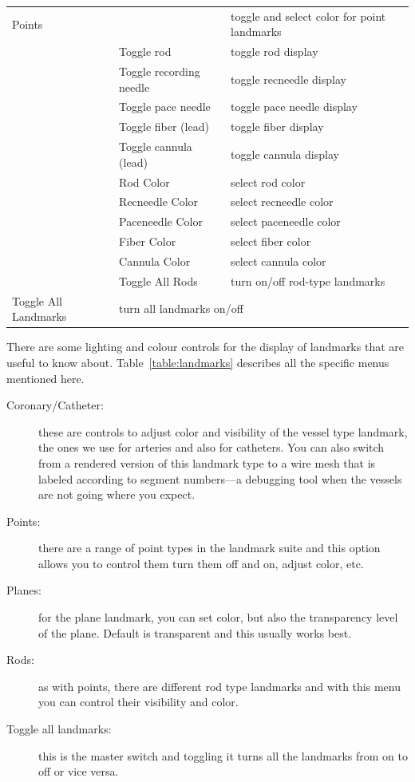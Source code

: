 \begin{table}[ht]
\begin{center}
\begin{tabular}{|l|p{1.5in}|p{3 in}|}
    Points & & toggle and select color for point landmarks \\
    & Toggle rod & toggle rod display\\
    & Toggle recording needle & toggle recneedle display \\ 
    & Toggle pace needle & toggle pace needle display \\ 
    & Toggle fiber (lead) & toggle fiber display \\ 
    & Toggle cannula (lead) & toggle cannula display \\ 
    & Rod Color & select rod color \\
    & Recneedle Color & select recneedle color \\
    & Paceneedle Color & select paceneedle color \\
    & Fiber Color & select fiber color \\
    & Cannula Color & select cannula color \\
    & Toggle All Rods & turn on/off rod-type landmarks \\ \hline
    Toggle All Landmarks & \multicolumn{2}{|l|}{turn all landmarks on/off} \\
    \hline
    \end{tabular}
  \end{center}
\end{table}

There are some lighting and colour controls for the display of landmarks
that are useful to know about.  Table~\ref{table:landmarks} describes all
the specific menus mentioned here.

\begin{description}
  \item [Coronary/Catheter: ] these are controls to adjust color and
        visibility of the vessel type landmark, the ones we use for
        arteries and also for catheters.  You can also switch from a
        rendered version of this landmark type to a wire mesh that is
        labeled according to segment numbers---a debugging tool when the
        vessels are not going where you expect.
  \item [Points: ] there are a range of point types in the landmark suite
        and this option allows you to control them turn them off and on,
        adjust color, etc.
  \item [Planes: ] for the plane landmark, you can set color, but also the
        transparency level of the plane.  Default is transparent and this
        usually works best.
  \item [Rods: ] as with points, there are different rod type landmarks and
        with this menu you can control their visibility and color.
  \item [Toggle all landmarks: ] this is the master switch and toggling it
        turns all the landmarks from on to off or vice versa.

\end{description}


